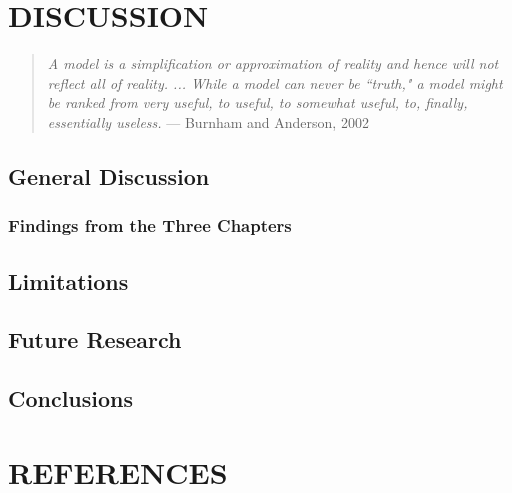 \documentclass[]{DissertateUSU}
\begin{document}
\FloatBarrier

\newpage

 \fancyhead[R]{\thepage} \fancyfoot[C]{}

\chapter{DISCUSSION}

\begin{quote}
\emph{A model is a simplification or approximation of reality and hence will not reflect all of reality. ... While a model can never be ``truth," a model might be ranked from very useful, to useful, to somewhat useful, to, finally, essentially useless.}
--- Burnham and Anderson, 2002
\end{quote}

\doublespacing

\section{General Discussion}\label{general-discussion}

\subsection{Findings from the Three
Chapters}\label{findings-from-the-three-chapters}

\section{Limitations}\label{limitations}

\section{Future Research}\label{future-research}

\section{Conclusions}\label{conclusions-1}

\singlespacing

\FloatBarrier

\newpage

 \fancyhead[R]{\thepage} \fancyfoot[C]{}

\chapter*{REFERENCES}
\end{document}
